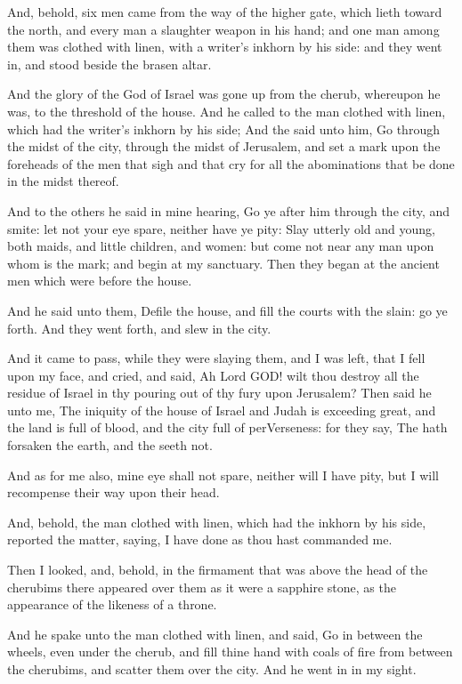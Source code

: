 \Verse And, behold, six men came from the way of the higher gate, which lieth toward the north, and every man a slaughter weapon in his hand; and one man among them was clothed with linen, with a writer's inkhorn by his side: and they went in, and stood beside the brasen altar.

\Verse And the glory of the God of Israel was gone up from the cherub, whereupon he was, to the threshold of the house. And he called to the man clothed with linen, which had the writer's inkhorn by his side; \Verse And the \LORD said unto him, Go through the midst of the city, through the midst of Jerusalem, and set a mark upon the foreheads of the men that sigh and that cry for all the abominations that be done in the midst thereof.

\Verse And to the others he said in mine hearing, Go ye after him through the city, and smite: let not your eye spare, neither have ye pity: \Verse Slay utterly old and young, both maids, and little children, and women: but come not near any man upon whom is the mark; and begin at my sanctuary. Then they began at the ancient men which were before the house.

\Verse And he said unto them, Defile the house, and fill the courts with the slain: go ye forth. And they went forth, and slew in the city.

\Verse And it came to pass, while they were slaying them, and I was left, that I fell upon my face, and cried, and said, Ah Lord GOD! wilt thou destroy all the residue of Israel in thy pouring out of thy fury upon Jerusalem?  \Verse Then said he unto me, The iniquity of the house of Israel and Judah is exceeding great, and the land is full of blood, and the city full of perVerseness: for they say, The \LORD hath forsaken the earth, and the \LORD seeth not.

\Verse And as for me also, mine eye shall not spare, neither will I have pity, but I will recompense their way upon their head.

\Verse And, behold, the man clothed with linen, which had the inkhorn by his side, reported the matter, saying, I have done as thou hast commanded me.


\Chapter
\Verse Then I looked, and, behold, in the firmament that was above the head of the cherubims there appeared over them as it were a sapphire stone, as the appearance of the likeness of a throne.

\Verse And he spake unto the man clothed with linen, and said, Go in between the wheels, even under the cherub, and fill thine hand with coals of fire from between the cherubims, and scatter them over the city. And he went in in my sight.

